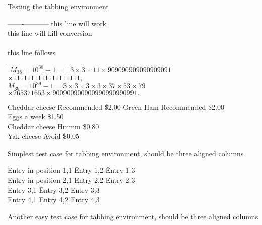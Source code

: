 \documentclass{article}
\begin{document}
Testing the tabbing environment

\begin{table}
\begin{center}
\begin{tabbing}
------\= ------------\=\kill
\> this \> line will work \\
\> this \> line will kill conversion \\ \\
\> this \> line follows \\
\end{tabbing}
\end{center}
\end{table}


\begin{table}
\begin{center}
\begin{tabbing}
\hspace*{1cm}\= $M_{38}=10^{38}-1=$ \= $3\times 3 \times 11 \times 909090909090909091$\\
                \>                     \> $\times 1111111111111111111,$\\
                \> $M_{39}= 10^{39}-1= 3 \times 3 \times 3 \times 3 \times 37 \times 53 \times 79$\\ 
                \>                     \> $\times 265371653 \times 900900900900990990990991.$
\end{tabbing}
\end{center}
\end{table}


\begin{table}
\begin{center}
\begin{tabbing}
Cheddar cheese \= Recommended \= \$2.00 \kill
Green Ham \> Recommended \> \$2.00      \\
Eggs  a week \> \$1.50              \\
Cheddar cheese \> Hmmm \> \$0.80        \\
Yak cheese \> Avoid \> \$0.05
\end{tabbing}
\caption{Simplest test case for tabbing environment, should be
three aligned columns}
\end{center}
\end{table}

\begin{table}
\begin{center}
\begin{tabbing}
Entry in position 1,1 \= Entry 1,2 \= Entry 1,3\\
Entry in position 2,1 \> Entry 2,2 \> Entry 2,3\\
Entry 3,1 \= Entry 3,2 \> Entry 3,3            \\
Entry 4,1 \> Entry 4,2 \> Entry 4,3
\end{tabbing}
\caption{Another easy test case for tabbing environment, should be
three aligned columns}
\end{center}
\end{table}
\end{document}
